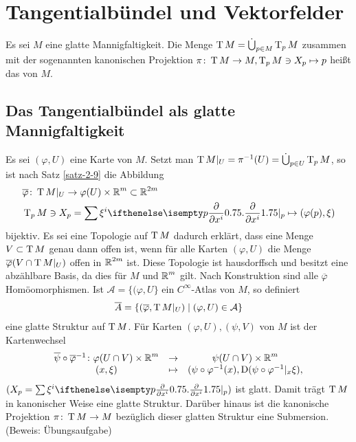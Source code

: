 
\chapter{Tangentialbündel und Vektorfelder}

\begin{Dfn}[Tangentialbündel]
  Es sei $M$ eine glatte Mannigfaltigkeit. Die Menge $\operatorname{T} M = \dot \bigcup_{p \in M}\operatorname{T}_pM$ zusammen mit der sogenannten kanonischen Projektion $\pi \colon \operatorname{T} M \to M, \operatorname{T}_pM \ni X_p \mapsto p$ heißt das  von $M$.
\end{Dfn}

\section{Das Tangentialbündel als glatte Mannigfaltigkeit}

Es sei $(\varphi, U)$ eine Karte von $M$. Setzt man $\operatorname{T} M|_U = \pi^{-1}(U) = \dot \bigcup_{p\in U}\operatorname{T}_pM$, so ist nach Satz \ref{satz-2-9}
die Abbildung
\begin{align*}
  & \overline \varphi \colon \T M|_U \to \varphi(U) \times \R^m \subset \R^{2m}\\
  &\T_p M \ni X_p = \sum \xi^i\pdifffrac[p]{}{x^i} \mapsto (\varphi(p),\xi)
\end{align*}
bijektiv.
Es sei eine Topologie auf $\operatorname{T} M$ dadurch erklärt, dass eine Menge $V \subset \operatorname{T} M$ genau dann offen ist, wenn für alle Karten $(\varphi, U)$ die Menge $\overline \varphi(V \cap \operatorname{T} M|_U)$ offen in $\operatorname{\mathbb{R}}^{2m}$ ist. Diese Topologie ist hausdorffsch und besitzt eine abzählbare Basis, da dies für $M$ und $\operatorname{\mathbb{R}}^m$ gilt. Nach Konstruktion sind alle $\overline \varphi$ Homöomorphismen. Ist $\mathcal A = \{(\varphi, U\}$ ein $C^{\infty}$-Atlas von $M$, so definiert
\begin{align*}
  \overline A = \{(\overline \varphi, \operatorname{T} M|_U) \mid (\varphi, U) \in \mathcal A\}
\end{align*}
eine glatte Struktur auf $\operatorname{T} M$. Für Karten $(\varphi, U), (\psi, V)$ von $M$ ist der Kartenwechsel
\[\begin{array}{ccc}
  \overline \psi \circ \overline \varphi^{-1} \colon \varphi(U \cap V) \times \operatorname{\mathbb{R}}^m &\to& \psi(U \cap V) \times \operatorname{\mathbb{R}}^m \\
  (x, \xi) &\mapsto& (\psi \circ \varphi^{-1}(x),\operatorname{D}(\psi \circ \varphi^{-1}|_x\xi),
\end{array}\]
$(X_p = \sum \xi^i \pdifffrac[p]{}{x^i})$ ist glatt. Damit trägt $\operatorname{T} M$ in kanonischer Weise eine glatte Struktur.
Darüber hinaus ist die kanonische Projektion $\pi \colon \operatorname{T} M \to M$ bezüglich dieser glatten Struktur eine Submersion. (Beweis: Übungsaufgabe)

